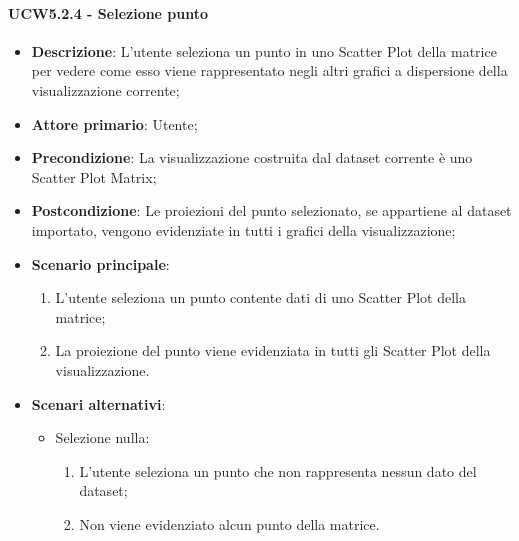 \paragraph{UCW5.2.4 - Selezione punto}
\label{par:ucw5.2.4}
\begin{itemize}
    \item \textbf{Descrizione}: L'utente seleziona un punto in uno Scatter Plot della matrice per vedere come
                                esso viene rappresentato negli altri grafici a dispersione della visualizzazione corrente;

    \item \textbf{Attore primario}: Utente;

    \item \textbf{Precondizione}:   La visualizzazione costruita dal dataset corrente è uno Scatter Plot Matrix;
    \item \textbf{Postcondizione}:  Le proiezioni del punto selezionato, se appartiene al dataset importato,
                                    vengono evidenziate in tutti i grafici della visualizzazione;

	\item \textbf{Scenario principale}:
        \begin{enumerate}
            \item L'utente seleziona un punto contente dati di uno Scatter Plot della matrice;
            \item La proiezione del punto viene evidenziata in tutti gli Scatter Plot della visualizzazione.
        \end{enumerate}

    \item \textbf{Scenari alternativi}:
    \begin{itemize}
        \item Selezione nulla:
        \begin{enumerate}
            \item L'utente seleziona un punto che non rappresenta nessun dato del dataset;
            \item Non viene evidenziato alcun punto della matrice.
        \end{enumerate}
    \end{itemize}

\end{itemize}


